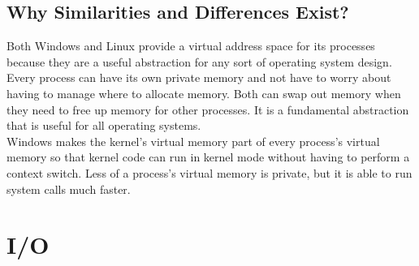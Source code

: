 \documentclass[letterpaper,10pt,titlepage]{article}
\begin{document}
\subsection{Why Similarities and Differences Exist?}
Both Windows and Linux provide a virtual address space for its processes
because they are a useful abstraction for any sort of operating system 
design. Every process can have its own private memory and not have to worry
about having to manage where to allocate memory. Both can swap out memory 
when they need to free up memory for other processes. It is a fundamental
abstraction that is useful for all operating systems.
\\
\linebreak
Windows makes the kernel's virtual memory part of every process's virtual 
memory so that kernel code can run in kernel mode without having to perform a 
context switch. Less of a process's virtual memory is private, but it is able
to run system calls much faster. 
\section{I/O}
\end{document}
